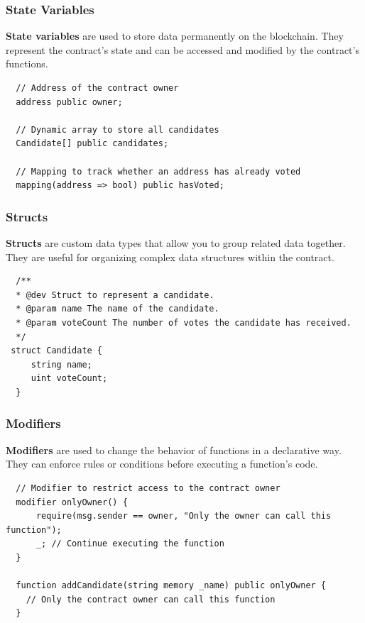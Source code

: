 \documentclass[12pt]{article}
\begin{document}
\subsubsection{State Variables}

\textbf{State variables} are used to store data permanently on the blockchain. They represent the contract's state and can be accessed and modified by the contract's functions.

\begin{verbatim}
  // Address of the contract owner
  address public owner;

  // Dynamic array to store all candidates
  Candidate[] public candidates;

  // Mapping to track whether an address has already voted
  mapping(address => bool) public hasVoted;
\end{verbatim}

\subsubsection{Structs}

\textbf{Structs} are custom data types that allow you to group related data together. They are useful for organizing complex data structures within the contract.

\begin{verbatim}
  /**
  * @dev Struct to represent a candidate.
  * @param name The name of the candidate.
  * @param voteCount The number of votes the candidate has received.
  */
 struct Candidate {
     string name;
     uint voteCount;
  }
\end{verbatim}

\subsubsection{Modifiers}

\textbf{Modifiers} are used to change the behavior of functions in a declarative way. They can enforce rules or conditions before executing a function's code.

\begin{verbatim}
  // Modifier to restrict access to the contract owner
  modifier onlyOwner() {
      require(msg.sender == owner, "Only the owner can call this function");
      _; // Continue executing the function
  }

  function addCandidate(string memory _name) public onlyOwner {
    // Only the contract owner can call this function
  }
\end{verbatim}
\end{document}

